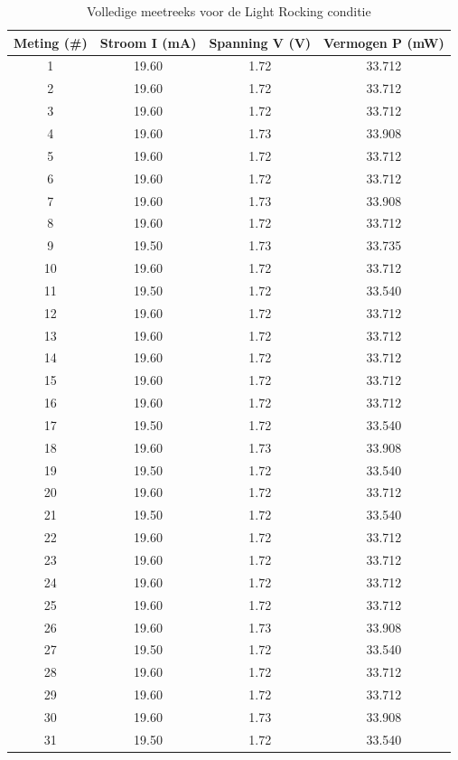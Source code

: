 \begin{table}[htbp]
\centering
\caption{Volledige meetreeks voor de Light Rocking conditie}
\label{tab:light_rocking_data}
\begin{tabular}{c S[table-format=2.2] S[table-format=1.2] S[table-format=2.3]}
\toprule
\textbf{Meting (\#)} & {\textbf{Stroom I (mA)}} & {\textbf{Spanning V (V)}} & {\textbf{Vermogen P (mW)}} \\
  & 19.60 & 1.72 & 33.712 \\
2  & 19.60 & 1.72 & 33.712 \\
3  & 19.60 & 1.72 & 33.712 \\
4  & 19.60 & 1.73 & 33.908 \\
5  & 19.60 & 1.72 & 33.712 \\
6  & 19.60 & 1.72 & 33.712 \\
7  & 19.60 & 1.73 & 33.908 \\
8  & 19.60 & 1.72 & 33.712 \\
9  & 19.50 & 1.73 & 33.735 \\
10 & 19.60 & 1.72 & 33.712 \\
11 & 19.50 & 1.72 & 33.540 \\
12 & 19.60 & 1.72 & 33.712 \\
13 & 19.60 & 1.72 & 33.712 \\
14 & 19.60 & 1.72 & 33.712 \\
15 & 19.60 & 1.72 & 33.712 \\
16 & 19.60 & 1.72 & 33.712 \\
17 & 19.50 & 1.72 & 33.540 \\
18 & 19.60 & 1.73 & 33.908 \\
19 & 19.50 & 1.72 & 33.540 \\
20 & 19.60 & 1.72 & 33.712 \\
21 & 19.50 & 1.72 & 33.540 \\
22 & 19.60 & 1.72 & 33.712 \\
23 & 19.60 & 1.72 & 33.712 \\
24 & 19.60 & 1.72 & 33.712 \\
25 & 19.60 & 1.72 & 33.712 \\
26 & 19.60 & 1.73 & 33.908 \\
27 & 19.50 & 1.72 & 33.540 \\
28 & 19.60 & 1.72 & 33.712 \\
29 & 19.60 & 1.72 & 33.712 \\
30 & 19.60 & 1.73 & 33.908 \\
31 & 19.50 & 1.72 & 33.540 \\

\end{tabular}
\end{table}
